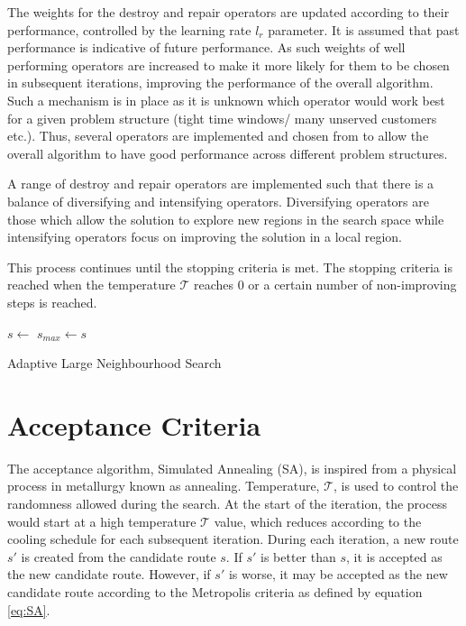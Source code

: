 The weights for the destroy and repair operators are updated according to their performance, controlled by the learning rate $l_{r}$ parameter. It is assumed that past performance is indicative of future performance. As such weights of well performing operators are increased to make it more likely for them to be chosen in subsequent iterations, improving the performance of the overall algorithm. Such a mechanism is in place as it is unknown which operator would work best for a given problem structure (tight time windows/ many unserved customers etc.). Thus, several operators are implemented and chosen from to allow the overall algorithm to have good performance across different problem structures. 

A range of destroy and repair operators are implemented such that there is a balance of diversifying and intensifying operators. Diversifying operators are those which allow the solution to explore new regions in the search space while intensifying operators focus on improving the solution in a local region.

This process continues until the stopping criteria is met. The stopping criteria is reached when the temperature $\mathcal{T}$ reaches 0 or a certain number of non-improving steps is reached.

\begin{algorithm} 
\BlankLine
$s \leftarrow$ \; \label{Al1:L1}
$s_{max} \leftarrow s$\;
\caption{Adaptive Large Neighbourhood Search} \label{Algo_1}
\end{algorithm} 

\section{Acceptance Criteria} \label{sec:SA}
The acceptance algorithm, Simulated Annealing (SA), is inspired from a physical process in metallurgy known as annealing. Temperature, $\mathcal{T}$, is used to control the randomness allowed during the search. At the start of the iteration, the process would start at a high temperature $\mathcal{T}$ value, which reduces according to the cooling schedule for each subsequent iteration. During each iteration, a new route $s'$ is created from the candidate route $s$. If  $s'$ is better than $s$, it is accepted as the new candidate route. However, if $s'$ is worse, it may be accepted as the new candidate route according to the Metropolis criteria as defined by equation \ref{eq:SA}.

